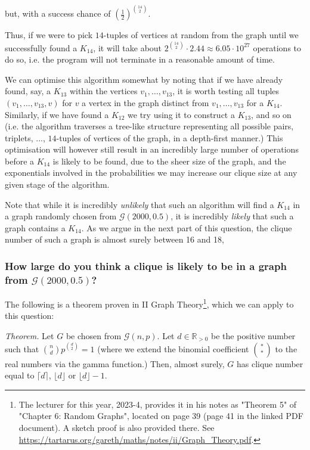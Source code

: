 \documentclass{article}
\begin{document}
but, with a success chance of $\left( \frac{1}{2} \right)^{\binom{14}{2}}$.

Thus, if we were to pick $14$-tuples of vertices at random from the graph until we successfully found a $K_{14}$, it will take about $2^{\binom{14}{2}} \cdot 2.44 \approx 6.05 \cdot 10^{27}$ operations to do so, i.e. the program will not terminate in a reasonable amount of time.

We can optimise this algorithm somewhat by noting that if we have already found, say, a $K_{13}$ within the vertices $v_1, \dots, v_{13}$, it is worth testing all tuples $(v_1, \dots, v_{13}, v)$ for $v$ a vertex in the graph distinct from $v_1, \dots, v_{13}$ for a $K_{14}$. Similarly, if we have found a  $K_{12}$ we try using it to construct a $K_{13}$, and so on (i.e. the algorithm traverses a tree-like structure representing all possible pairs, triplets, ..., $14$-tuples of vertices of the graph, in a depth-first manner.) This optimisation will however still result in an incredibly large number of operations before a $K_{14}$ is likely to be found, due to the sheer size of the graph, and the exponentials involved in the probabilities we may increase our clique size at any given stage of the algorithm.

Note that while it is incredibly \emph{unlikely} that such an algorithm will find a $K_{14}$ in a graph randomly chosen from $\mathcal{G}(2000, 0.5)$, it is incredibly \emph{likely} that such a graph contains a $K_{14}$. As we argue in the next part of this question, the clique number of such a graph is almost surely between 16 and 18, 

\subsubsection{How large do you think a clique is likely to be in a graph from $\mathcal{G}(2000, 0.5)$?}



The following is a theorem proven in II Graph Theory\footnote{The lecturer for this year, 2023-4, provides it in his notes as "Theorem 5" of "Chapter 6: Random Graphs", located on page 39 (page 41 in the linked PDF document). A sketch proof is also provided there. See \url{https://tartarus.org/gareth/maths/notes/ii/Graph_Theory.pdf}.}, which we can apply to this question:

\emph{Theorem.} Let $G$ be chosen from $\mathcal{G}(n,p)$. Let $d \in \mathbb{R}_{>0}$ be the positive number such that $\binom{n}{d} p^{\binom{d}{2}} = 1$ (where we extend the binomial coefficient $\binom{\ast}{\ast}$ to the real numbers via the gamma function.) Then, almost surely, $G$ has clique number equal to $\lceil d \rceil$, $\lfloor d \rfloor$ or $\lfloor d \rfloor - 1$.
\end{document}

